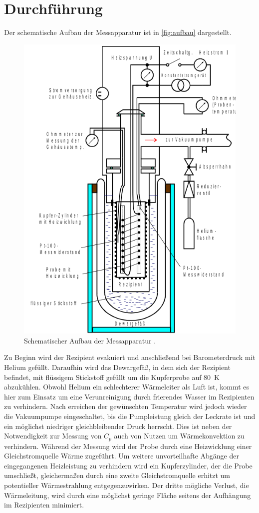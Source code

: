 \section{Durchführung}
\label{sec:Durchführung}
Der schematische Aufbau der Messapparatur ist in \autoref{fig:aufbau} dargestellt.

\begin{figure}
    \centering
    \includegraphics[width=0.8\linewidth]{abb/aufbau.png}
    \caption{Schematischer Aufbau der Messapparatur \cite{sample}.}
    \label{fig:aufbau}
\end{figure}

Zu Beginn wird der Rezipient evakuiert und anschließend bei Barometerdruck mit Helium gefüllt.
Daraufhin wird das Dewargefäß, in dem sich der Rezipient befindet, mit flüssigem Stickstoff gefüllt um die Kupferprobe auf \qty{80}{\kelvin} abzukühlen.
Obwohl Helium ein schlechterer Wärmeleiter als Luft ist, kommt es hier zum Einsatz um eine Verunreinigung durch frierendes Wasser im Rezipienten zu verhindern.
Nach erreichen der gewünschten Temperatur wird jedoch wieder die Vakuumpumpe eingeschaltet, bis die Pumpleistung gleich der Leckrate ist und
ein möglichst niedriger gleichbleibender Druck herrscht. Dies ist neben der Notwendigkeit zur Messung von $C_p$ auch von Nutzen um Wärmekonvektion zu verhindern.
Während der Messung wird der Probe durch eine Heizwicklung einer Gleichstromquelle Wärme zugeführt.
Um weitere unvorteilhafte Abgänge der eingegangenen Heizleistung zu verhindern wird ein Kupferzylinder, der die Probe umschließt, gleichermaßen durch eine
zweite Gleichstromquelle erhitzt um potentieller Wärmestrahlung entgegenzuwirken.
Der dritte mögliche Verlust, die Wärmeleitung, wird durch eine möglichst geringe Fläche seitens der Aufhängung im Rezipienten minimiert.

